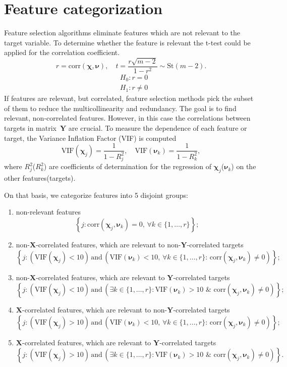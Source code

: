 \documentclass[12pt,twoside]{article}
\newcommand{\bY}{\mathbf{Y}}
\newcommand{\bX}{\mathbf{X}}
\newcommand{\bchi}{\boldsymbol{\chi}}
\newcommand{\bnu}{\boldsymbol{\nu}}
\begin{document}
\section{Feature categorization}
Feature selection algorithms eliminate features which are not relevant to the target variable. 
To determine whether the feature is relevant the t-test could be applied for the correlation coefficient.
\[
	r = \text{corr} (\bchi, \bnu), \quad t = \frac{r \sqrt{m - 2}}{1 - r^2} \sim \text{St} (m - 2).
\]
\begin{align*}
&H_0: r = 0 \\
&H_1: r \neq 0
\end{align*}
If features are relevant, but correlated, feature selection methods pick the subset of them to reduce the multicollinearity and redundancy.
The goal is to find relevant, non-correlated features. 
However, in this case the correlations between targets in matrix~$\bY$ are crucial.
To measure the dependence of each feature or target, the Variance Inflation Factor (VIF) is computed
\[
	\text{VIF}(\bchi_j) = \frac{1}{1 - R_j^2}, \quad \text{VIF}(\bnu_k) = \frac{1}{1 - R_k^2},
\]
where $R_j^2$($R_k^2$) are coefficients of determination for the regression of $\bchi_j$($\bnu_k$) on the other features(targets).

On that basis, we categorize features into 5 disjoint groups:
\begin{enumerate}
	\item non-relevant features
	\[
		\left\{j: \text{corr}(\bchi_j, \bnu_k) = 0, \, \forall k \in \{1, \dots, r\}\right\};
	\]
	\item non-$\bX$-correlated features, which are relevant to non-$\bY$-correlated targets
	\[
		\left\{j: \left(\text{VIF}(\bchi_j) < 10\right) \, \text{and} \, \left(\text{VIF}(\bnu_k) < 10 , \, \forall k \in \{1, \dots, r\}: \,  \text{corr}(\bchi_j, \bnu_k) \neq 0 \right)\right\};
	\]
	\item non-$\bX$-correlated features, which are relevant to $\bY$-correlated targets
	\[
		\left\{j: \left(\text{VIF}(\bchi_j) < 10\right) \, \text{and} \, \left( \exists k \in \{1, \dots, r\}: \text{VIF}(\bnu_k) > 10 \,\, \& \,\, \text{corr}(\bchi_j, \bnu_k) \neq 0 \right)\right\};
	\]
	\item $\bX$-correlated features, which are relevant to non-$\bY$-correlated targets
	\[
		\left\{j: \left(\text{VIF}(\bchi_j) > 10\right) \, \text{and} \, \left(\text{VIF}(\bnu_k) < 10 , \, \forall k \in \{1, \dots, r\}: \,  \text{corr}(\bchi_j, \bnu_k) \neq 0 \right)\right\};
	\]
	\item $\bX$-correlated features, which are relevant to $\bY$-correlated targets
	\[
		\left\{j: \left(\text{VIF}(\bchi_j) > 10\right) \, \text{and} \, \left( \exists k \in \{1, \dots, r\}: \text{VIF}(\bnu_k) > 10 \,\, \& \,\, \text{corr}(\bchi_j, \bnu_k) \neq 0 \right)\right\}.
	\]
\end{enumerate}
\end{document}
